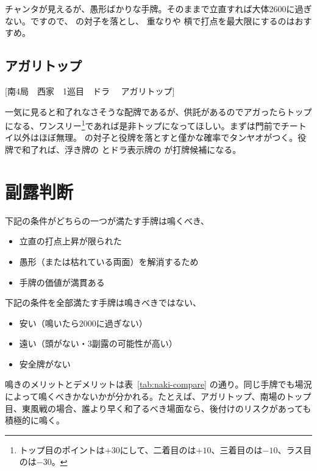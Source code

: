 \documentclass[10pt, twocolumn]{article}
\begin{document}
チャンタが見えるが、愚形ばかりな手牌。そのままで立直すれば大体2600に過ぎない。ですので、 の対子を落とし、 重なりや  槓で打点を最大限にするのはおすすめ\citep[][pp. 74--79]{tetsusenryaku}。

\subsection{アガリトップ}

[南4局　西家　1巡目　ドラ 　アガリトップ]

一気に見ると和了れなさそうな配牌であるが、供託があるのでアガったらトップになる、ワンスリー\footnote{トップ目のポイントは$+30$にして、二着目のは$+10$、三着目のは$-10$、ラス目のは$-30$。}であれば是非トップになってほしい。まずは門前でチートイ以外はほぼ無理。 の対子と役牌を落とすと僅かな確率でタンヤオがつく。役牌で和了れば、浮き牌の  とドラ表示牌の  が打牌候補になる\citep[][pp. 114--119]{tetsusenryaku}。


\section{副露判断}

下記の条件がどちらの一つが満たす手牌は鳴くべき\citep[][pp. 36--41, p. 45, pp. 58--61]{hirasawa-naki}、

\begin{itemize}
\item 立直の打点上昇が限られた
\item 愚形（または枯れている両面）を解消するため
\item 手牌の価値が満貫ある
\end{itemize}

下記の条件を全部満たす手牌は鳴きべきではない、

\begin{itemize}
\item 安い（鳴いたら2000に過ぎない）
\item 遠い（頭がない・3副露の可能性が高い）
\item 安全牌がない
\end{itemize}

鳴きのメリットとデメリットは表~\ref{tab:naki-compare} の通り。同じ手牌でも場況によって鳴くべきかないかが分かれる。たとえば、アガリトップ、南場のトップ目、東風戦の場合、誰より早く和了るべき場面なら、後付けのリスクがあっても積極的に鳴く\citep[][pp. 138--145]{tetsusenryaku}。
\end{document}
